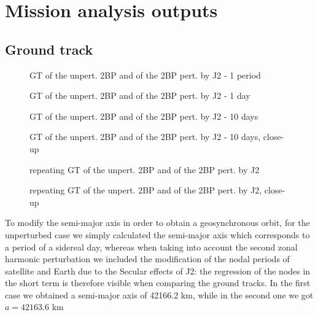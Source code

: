 \documentclass[11pt,a4paper]{report}
\begin{document}
\section{Mission analysis outputs}

\subsection{Ground track}
\begin{figure}[H]
\centering
{}
\caption{GT of the unpert. 2BP and of the 2BP pert. by J2 - 1 period}
\end{figure}
\begin{figure}[H]
\centering
{}
\caption{GT of the unpert. 2BP and of the 2BP pert. by J2 - 1 day}
\end{figure}
\begin{figure}[H]
\centering
{}
\caption{GT of the unpert. 2BP and of the 2BP pert. by J2 - 10 days}
\end{figure}
\begin{figure}[H]
\centering
{}
\caption{GT of the unpert. 2BP and of the 2BP pert. by J2 - 10 days, close-up}
\end{figure}
\begin{figure}[H]
\centering
{}
\caption{repeating GT of the unpert. 2BP and of the 2BP pert. by J2}
\end{figure}
\begin{figure}[H]
\centering
{}
\caption{repeating GT of the unpert. 2BP and of the 2BP pert. by J2, close-up}
\end{figure}

To modify the semi-major axis in order to obtain a geosynchronous orbit, for the unperturbed case we simply calculated the semi-major axis which corresponds to a period of a sidereal day, whereas when taking into account the second zonal harmonic perturbation we included the modification of the nodal periods of satellite and Earth due to the Secular effects of J2: the regression of the nodes in the short term is therefore visible when comparing the ground tracks.
In the first case we obtained a semi-major axis of 42166.2 km, while in the second one we got $a = 42163.6$ km
\end{document}
